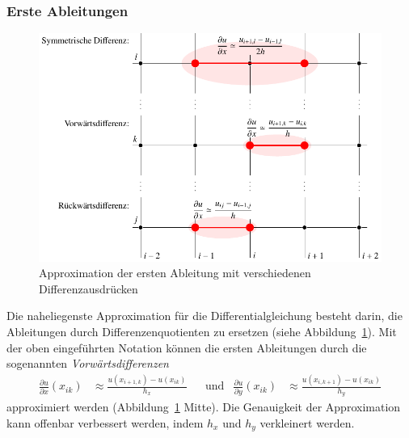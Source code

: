 \subsubsection{Erste Ableitungen}
\begin{figure}
\centering
\includegraphics{chapters/70-pde/images/derivatives.pdf}
\caption{Approximation der ersten Ableitung mit verschiedenen
Differenzausdrücken
\label{buch:pde:1abldiff}}
\end{figure}
Die naheliegenste Approximation für die Differentialgleichung besteht
darin, die Ableitungen durch Differenzenquotienten zu ersetzen (siehe 
Abbildung~\ref{buch:pde:1abldiff}).
Mit der oben eingeführten Notation können die ersten Ableitungen durch
die sogenannten {\em Vorwärtsdifferenzen}
%
\begin{align}
\frac{\partial u}{\partial x} (x_{ik}) 
&\approx
\frac{u(x_{i+1,k}) - u(x_{ik})}{h_x}
&
&\text{und}
&
\frac{\partial u}{\partial y} (x_{ik}) 
&\approx
\frac{u(x_{i,k+1}) - u(x_{ik})}{h_y}
\label{chapter:pde:approx1st}
\end{align}
approximiert werden (Abbildung~\ref{buch:pde:1abldiff} Mitte).
Die Genauigkeit der Approximation kann offenbar verbessert werden, 
indem $h_x$ und $h_y$ verkleinert werden.

